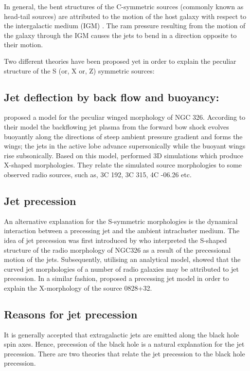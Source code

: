 In general, the bent structures of the C-symmetric sources (commonly known as head-tail sources) are attributed to the motion of the host galaxy with respect to the intergalactic medium (IGM) \citep{begelman84, morsony13}. The ram pressure resulting from the motion of the galaxy through the IGM causes the jets to bend in a direction opposite to their motion. 

Two different theories have been proposed yet in order to explain the peculiar structure of the S (or, X or, Z) symmetric sources:
\subsection{Jet deflection by back flow and buoyancy:}
 \citet{worrall95} proposed a model for the peculiar winged morphology of NGC 326. According to their model the backflowing jet plasma from the forward bow shock evolves buoyantly along the directions of steep ambient pressure gradient and forms the wings; the jets in the active lobe advance supersonically while the buoyant wings rise subsonically. Based on this model, \citet{hodges-kluck11} performed 3D simulations which produce X-shaped morphologies. They relate the simulated source morphologies to some observed radio sources, such as, 3C 192, 3C 315, 4C -06.26 etc. 
 
 \subsection{Jet precession}
 An alternative explanation for the S-symmetric morphologies is the dynamical interaction between a precessing jet and the ambient intracluster medium. The idea of jet precession was first introduced by \citet{ekers78} who interpreted the S-shaped structure of the radio morphology of NGC326 as a result of the precessional motion of the jets. Subsequently, utilising an analytical model, \citet{gower82} showed that the curved jet morphologies of a number of radio galaxies may be attributed to jet precession. In a similar fashion, \citep{klein95} proposed a precessing jet model in order to explain the X-morphology of the source 0828+32. 

\subsection{Reasons for jet precession} \label{s:rfjpr}
It is generally accepted that extragalactic jets are emitted along the black hole spin axes. Hence, precession of the black hole is a natural explanation for the jet precession. There are two theories that relate the jet precession to the black hole precession. 

